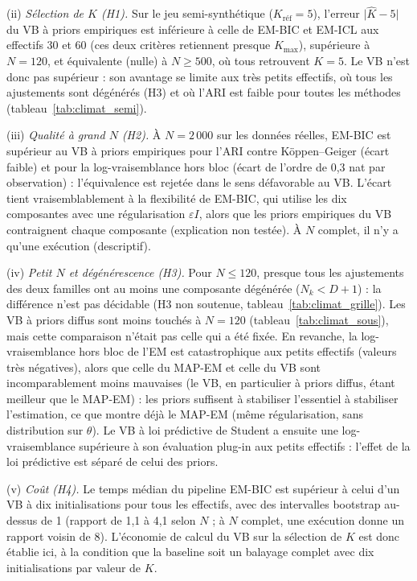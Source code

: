 (ii) \emph{Sélection de $K$ (H1).} Sur le jeu semi-synthétique ($K_{\text{réf}}=5$), l'erreur $\lvert\hat K-5\rvert$ du VB à priors empiriques est inférieure à celle de EM-BIC et EM-ICL aux effectifs 30 et 60 (ces deux critères retiennent presque $K_{\max}$), supérieure à $N=120$, et équivalente (nulle) à $N \geq 500$, où tous retrouvent $K=5$. Le VB n'est donc pas supérieur : son avantage se limite aux très petits effectifs, où tous les ajustements sont dégénérés (H3) et où l'ARI est faible pour toutes les méthodes (tableau~\ref{tab:climat_semi}).

(iii) \emph{Qualité à grand $N$ (H2).} À $N=2\,000$ sur les données réelles, EM-BIC est supérieur au VB à priors empiriques pour l'ARI contre Köppen--Geiger (écart faible) et pour la log-vraisemblance hors bloc (écart de l'ordre de 0,3 nat par observation) : l'équivalence est rejetée dans le sens défavorable au VB. L'écart tient vraisemblablement à la flexibilité de EM-BIC, qui utilise les dix composantes avec une régularisation $\varepsilon I$, alors que les priors empiriques du VB contraignent chaque composante (explication non testée). À $N$ complet, il n'y a qu'une exécution (descriptif).

(iv) \emph{Petit $N$ et dégénérescence (H3).} Pour $N \leq 120$, presque tous les ajustements des deux familles ont au moins une composante dégénérée ($N_k < D+1$) : la différence n'est pas décidable (H3 non soutenue, tableau~\ref{tab:climat_grille}). Les VB à priors diffus sont moins touchés à $N=120$ (tableau~\ref{tab:climat_sous}), mais cette comparaison n'était pas celle qui a été fixée. En revanche, la log-vraisemblance hors bloc de l'EM est catastrophique aux petits effectifs (valeurs très négatives), alors que celle du MAP-EM et celle du VB sont incomparablement moins mauvaises (le VB, en particulier à priors diffus, étant meilleur que le MAP-EM) : les priors suffisent à stabiliser l'essentiel à stabiliser l'estimation, ce que montre déjà le MAP-EM (même régularisation, sans distribution sur $\theta$). Le VB à loi prédictive de Student a ensuite une log-vraisemblance supérieure à son évaluation plug-in aux petits effectifs : l'effet de la loi prédictive est séparé de celui des priors.

(v) \emph{Coût (H4).} Le temps médian du pipeline EM-BIC est supérieur à celui d'un VB à dix initialisations pour tous les effectifs, avec des intervalles bootstrap au-dessus de 1 (rapport de 1,1 à 4,1 selon $N$ ; à $N$ complet, une exécution donne un rapport voisin de 8). L'économie de calcul du VB sur la sélection de $K$ est donc établie ici, à la condition que la baseline soit un balayage complet avec dix initialisations par valeur de $K$.

